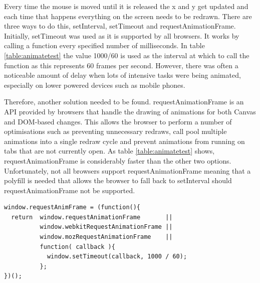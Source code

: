 \documentclass[12pt,a4paper]{report}
\begin{document}
Every time the mouse is moved until it is released the x and y get updated and each time that happens everything on the screen needs to be redrawn. There are three ways to do this, setInterval, setTimeout and requestAnimationFrame. Initially, setTimeout was used as it is supported by all browsers. It works by calling a function every specified number of milliseconds. In table \ref{table:animatetest} the value 1000/60 is used as the interval at which to call the function as this represents 60 frames per second. However, there was often a noticeable amount of delay when lots of intensive tasks were being animated, especially on lower powered devices such as mobile phones.

Therefore, another solution needed to be found. requestAnimationFrame is an API provided by browsers that handle the drawing of animations for both Canvas and DOM-based changes. This allows the browser to perform a number of optimisations such as preventing unnecessary redraws, call pool multiple animations into a single redraw cycle and prevent animations from running on tabs that are not currently open. As table \ref{table:animatetest} shows, requestAnimationFrame is considerably faster than the other two options. Unfortunately, not all browsers support requestAnimationFrame meaning that a polyfill is needed that allows the browser to fall back to setInterval should requestAnimationFrame not be supported.

\begin{minipage}{\linewidth}
\begin{lstlisting}
window.requestAnimFrame = (function(){
  return  window.requestAnimationFrame       ||
          window.webkitRequestAnimationFrame ||
          window.mozRequestAnimationFrame    ||
          function( callback ){
            window.setTimeout(callback, 1000 / 60);
          };
})();
\end{lstlisting}
\end{minipage}
\end{document}
